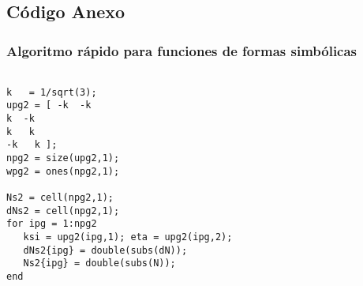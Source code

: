  \clearpage
 \subsection*{Código \Matlab{} Anexo}
    \subsubsection*{Algoritmo rápido para funciones de formas simbólicas}

\begin{code}
	\begin{verbatim} 

k   = 1/sqrt(3);
upg2 = [ -k  -k
k  -k
k   k
-k   k ];
npg2 = size(upg2,1);
wpg2 = ones(npg2,1);

Ns2 = cell(npg2,1);
dNs2 = cell(npg2,1);
for ipg = 1:npg2
   ksi = upg2(ipg,1); eta = upg2(ipg,2);
   dNs2{ipg} = double(subs(dN)); 
   Ns2{ipg} = double(subs(N));
end
	\end{verbatim}
\end{code}
